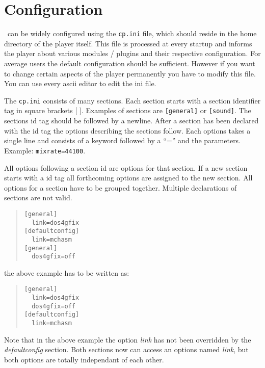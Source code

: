 %
%

\chapter{Configuration}
\label{cp.ini}
\cp\ can be widely configured using the \texttt{cp.ini} file, which should
reside in the home directory of the player itself. This file is
processed at every startup and informs the player about various
modules / plugins and their respective configuration. For average
users the default configuration should be sufficient. However if you
want to change certain aspects of the player permanently you have to
modify this file. You can use every ascii editor to edit the ini file.

The \texttt{cp.ini} consists of many sections. Each section starts
with a section identifier tag in square brackets [ ]. Examples of
sections are \texttt{[general]} or
\texttt{[sound]}. The sections id tag should be followed by a newline. After
a section has been declared with the id tag the options describing the
sections follow. Each options takes a single line and consists of a
keyword followed by a ``='' and the parameters. Example:
\texttt{mixrate=44100}.

All options following a section id are options for that section. If a
new section starts with a id tag all forthcoming options are assigned
to the new section. All options for a section have to be grouped
together. Multiple declarations of sections are not valid.
\begin{quote}
\begin{verbatim}
[general]
  link=dos4gfix
[defaultconfig]
  link=mchasm
[general]
  dos4gfix=off
\end{verbatim}
\end{quote}
the above example has to be written as:
\begin{quote}
\begin{verbatim}
[general]
  link=dos4gfix
  dos4gfix=off
[defaultconfig]
  link=mchasm
\end{verbatim}
\end{quote}
{\small Note that in the above example the option \emph{link} has not
been overridden by the \emph{defaultconfig} section. Both sections now
can access an options named \emph{link}, but both options are totally
independant of each other.}

